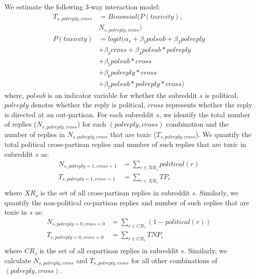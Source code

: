 \documentclass[letterpaper]{article} %
\begin{document}
We estimate the following 3-way interaction model:
\begin{align*}
  T_{s,polreply,cross} &= Binomial(P(toxicity),\\
  & N_{s,polreply,cross})\\
  P(toxicity) &= logit(\alpha_s + \beta_{1}polsub +  \beta_{2}polreply \\
  &+ \beta_{3}cross + \beta_{4}polsub*polreply \\
  &+ \beta_{5}polsub*cross \\
  &+ \beta_{6}polreply*cross \\
  &+ \beta_{7}polsub*polreply*cross)
\end{align*}
where, $polsub$ is an indicator variable for whether the subreddit $s$ is political, $polreply$ denotes whether the reply is political, $cross$ represents whether the reply is directed at an out-partisan. For each subreddit $s$, we identify the total number of replies ($N_{s,polreply,cross}$) for each $(polreply,cross)$ combination and the number of replies in $N_{s,polreply,cross}$ that are toxic ($T_{s,polreply,cross}$). We quantify the total political cross-partisan replies and number of such replies that are toxic in subreddit $s$ as:
\begin{align*}
N_{s,polreply=1,cross=1}&= \sum_{r\in XR_{s}}political(r)\\
T_{s,polreply=1,cross=1}&= \sum_{r\in XR_{s}}TP_r\\
\end{align*}
where $XR_s$ is the set of all cross-partisan replies in subreddit $s$. Similarly, we quantify the non-political co-partisan replies and number of such replies that are toxic in $s$ as:
\begin{align*}
N_{s,polreply=0,cross=0}&= \sum_{r\in CR_{s}}(1-political(r))\\
T_{s,polreply=0,cross=0}&= \sum_{r\in CR_{s}}TNP_r\\
\end{align*}
where $CR_s$ is the set of all copartisan replies in subreddit $s$. Similarly, we calculate $N_{s,polreply,cross}$ and $T_{s,polreply,cross}$ for all other combinations of $(polreply,cross)$.
\end{document}
